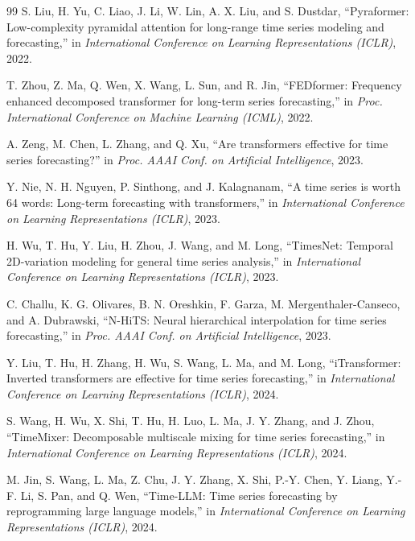 \documentclass[conference]{IEEEtran}
\begin{document}
\begin{thebibliography}{99}
S. Liu, H. Yu, C. Liao, J. Li, W. Lin, A. X. Liu, and S. Dustdar, ``Pyraformer: Low-complexity pyramidal attention for long-range time series modeling and forecasting,'' in \textit{International Conference on Learning Representations (ICLR)}, 2022.

T. Zhou, Z. Ma, Q. Wen, X. Wang, L. Sun, and R. Jin, ``FEDformer: Frequency enhanced decomposed transformer for long-term series forecasting,'' in \textit{Proc. International Conference on Machine Learning (ICML)}, 2022.

A. Zeng, M. Chen, L. Zhang, and Q. Xu, ``Are transformers effective for time series forecasting?'' in \textit{Proc. AAAI Conf. on Artificial Intelligence}, 2023.

Y. Nie, N. H. Nguyen, P. Sinthong, and J. Kalagnanam, ``A time series is worth 64 words: Long-term forecasting with transformers,'' in \textit{International Conference on Learning Representations (ICLR)}, 2023.

H. Wu, T. Hu, Y. Liu, H. Zhou, J. Wang, and M. Long, ``TimesNet: Temporal 2D-variation modeling for general time series analysis,'' in \textit{International Conference on Learning Representations (ICLR)}, 2023.

C. Challu, K. G. Olivares, B. N. Oreshkin, F. Garza, M. Mergenthaler-Canseco, and A. Dubrawski, ``N-HiTS: Neural hierarchical interpolation for time series forecasting,'' in \textit{Proc. AAAI Conf. on Artificial Intelligence}, 2023.

Y. Liu, T. Hu, H. Zhang, H. Wu, S. Wang, L. Ma, and M. Long, ``iTransformer: Inverted transformers are effective for time series forecasting,'' in \textit{International Conference on Learning Representations (ICLR)}, 2024.

S. Wang, H. Wu, X. Shi, T. Hu, H. Luo, L. Ma, J. Y. Zhang, and J. Zhou, ``TimeMixer: Decomposable multiscale mixing for time series forecasting,'' in \textit{International Conference on Learning Representations (ICLR)}, 2024.

M. Jin, S. Wang, L. Ma, Z. Chu, J. Y. Zhang, X. Shi, P.-Y. Chen, Y. Liang, Y.-F. Li, S. Pan, and Q. Wen, ``Time-LLM: Time series forecasting by reprogramming large language models,'' in \textit{International Conference on Learning Representations (ICLR)}, 2024.



\end{thebibliography}
\end{document}
